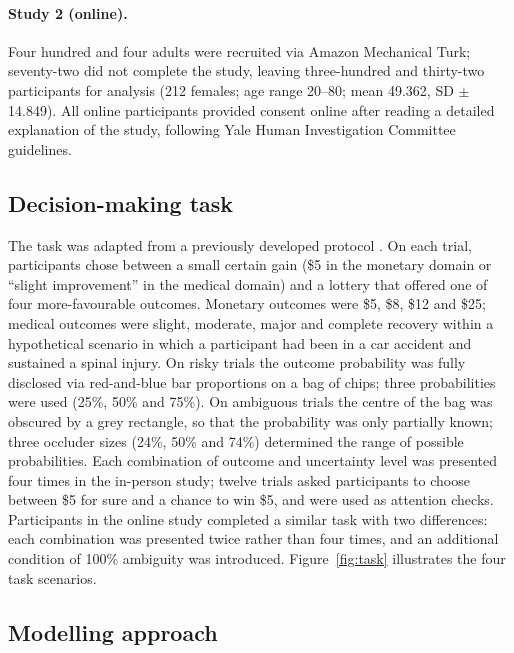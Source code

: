 \documentclass[11pt]{article}
\begin{document}
\paragraph{Study 2 (online).} Four hundred and four adults were recruited via Amazon Mechanical Turk; seventy-two did not complete the study, leaving three-hundred and thirty-two participants for analysis (212 females; age range 20--80; mean 49.362, SD $\pm$14.849). All online participants provided consent online after reading a detailed explanation of the study, following Yale Human Investigation Committee guidelines.

\subsection{Decision-making task}

The task was adapted from a previously developed protocol \citep{levy2012measuring}. On each trial, participants chose between a small certain gain (\$5 in the monetary domain or ``slight improvement'' in the medical domain) and a lottery that offered one of four more-favourable outcomes. Monetary outcomes were \$5, \$8, \$12 and \$25; medical outcomes were slight, moderate, major and complete recovery within a hypothetical scenario in which a participant had been in a car accident and sustained a spinal injury. On risky trials the outcome probability was fully disclosed via red-and-blue bar proportions on a bag of chips; three probabilities were used (25\%, 50\% and 75\%). On ambiguous trials the centre of the bag was obscured by a grey rectangle, so that the probability was only partially known; three occluder sizes (24\%, 50\% and 74\%) determined the range of possible probabilities. Each combination of outcome and uncertainty level was presented four times in the in-person study; twelve trials asked participants to choose between \$5 for sure and a chance to win \$5, and were used as attention checks. Participants in the online study completed a similar task with two differences: each combination was presented twice rather than four times, and an additional condition of 100\% ambiguity was introduced. Figure~\ref{fig:task} illustrates the four task scenarios.

\subsection{Modelling approach}
\end{document}

